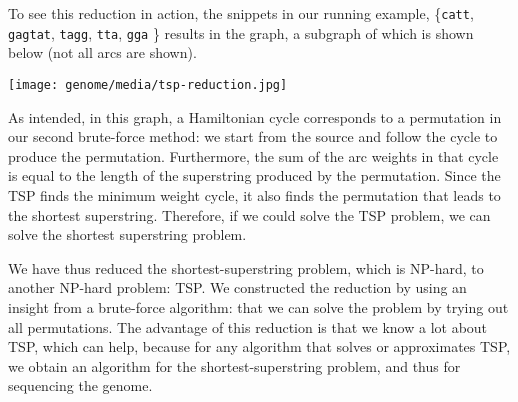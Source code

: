 \begin{cluster}
\label{grp:xmpl:genome::reduction}

\begin{example}
\label{xmpl:genome::reduction}
To see this reduction in action, the snippets in our running example,
\{\texttt{catt}, \texttt{gagtat}, \texttt{tagg},
  \texttt{tta}, \texttt{gga} \} 
results in the graph, a subgraph of which is shown below (not all arcs
are shown).

\begin{center}
\texttt{[image: genome/media/tsp-reduction.jpg]}
\end{center}


As intended, in this graph, a Hamiltonian cycle corresponds to
a permutation in our second brute-force method: we start from the source and
follow the cycle to produce the permutation.
Furthermore, the sum of the arc weights in that cycle is equal to the
length of the superstring produced by the permutation.
Since the TSP finds the minimum weight cycle, it also finds the
permutation that leads to the shortest superstring.
Therefore, if we could solve the TSP problem, we can solve the
shortest superstring problem.

\end{example}
\end{cluster}

\begin{cluster}
\label{grp:grm:genome::summary}

\begin{gram}[Summary]
\label{grm:genome::summary}
We have thus reduced the shortest-superstring problem, which is
NP-hard, to another NP-hard problem: TSP.
We constructed the reduction by using an insight from a brute-force
algorithm: that we can solve the problem by trying out all
permutations. 
The advantage of this reduction is that we know a lot about TSP, which
can help, because for any algorithm that solves or approximates TSP,
we obtain an algorithm for the shortest-superstring problem, and thus
for sequencing the genome.

\end{gram}
\end{cluster}

